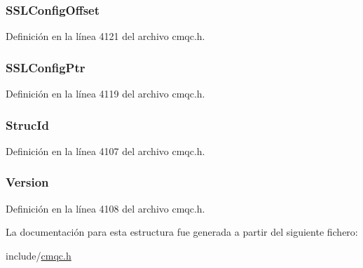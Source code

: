 \subsubsection[{S\+S\+L\+Config\+Offset}]{ S\+S\+L\+Config\+Offset}\label{structtag_m_q_c_n_o_a20bd6e5f8cb1b77946a9cdbd77e3eb03}


Definición en la línea 4121 del archivo cmqc.\+h.

\hypertarget{structtag_m_q_c_n_o_afd1588e665b4f8b035009e2a8ecec3cd}{}
\subsubsection[{S\+S\+L\+Config\+Ptr}]{ S\+S\+L\+Config\+Ptr}\label{structtag_m_q_c_n_o_afd1588e665b4f8b035009e2a8ecec3cd}


Definición en la línea 4119 del archivo cmqc.\+h.

\hypertarget{structtag_m_q_c_n_o_a0530922ca944569b52601d74941f96e4}{}
\subsubsection[{Struc\+Id}]{ Struc\+Id}\label{structtag_m_q_c_n_o_a0530922ca944569b52601d74941f96e4}


Definición en la línea 4107 del archivo cmqc.\+h.

\hypertarget{structtag_m_q_c_n_o_a0656ef8f766b3907d394d88a35d7b7e9}{}
\subsubsection[{Version}]{ Version}\label{structtag_m_q_c_n_o_a0656ef8f766b3907d394d88a35d7b7e9}


Definición en la línea 4108 del archivo cmqc.\+h.



La documentación para esta estructura fue generada a partir del siguiente fichero\+:\begin{DoxyCompactItemize}
\item 
include/\hyperlink{cmqc_8h}{cmqc.\+h}\end{DoxyCompactItemize}
